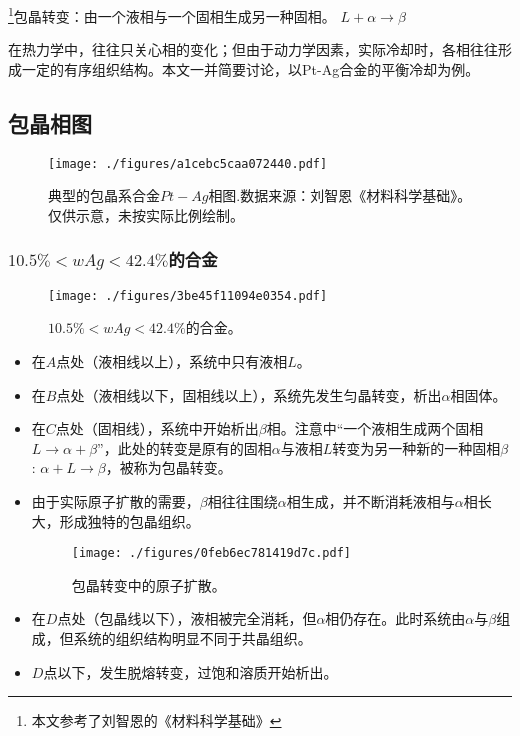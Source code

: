 

\footnote{本文参考了刘智恩的《材料科学基础》}包晶转变：由一个液相与一个固相生成另一种固相。 $L + \alpha \rightarrow \beta$

在热力学中，往往只关心相的变化；但由于动力学因素，实际冷却时，各相往往形成一定的有序组织结构。本文一并简要讨论，以Pt-Ag合金的平衡冷却为例。

\subsection{包晶相图}

\begin{figure}[ht]
\centering
\texttt{[image: ./figures/a1cebc5caa072440.pdf]}
\caption{典型的包晶系合金$Pt-Ag$相图.数据来源：刘智恩《材料科学基础》。仅供示意，未按实际比例绘制。} \label{fig_PERITC_4}
\end{figure}

\subsubsection{$10.5\%<wAg<42.4\%$的合金} 
\begin{figure}[ht]
\centering
\texttt{[image: ./figures/3be45f11094e0354.pdf]}
\caption{$10.5\%<wAg<42.4\%$的合金。} \label{fig_PERITC_2}
\end{figure}

\begin{itemize}
\item 在$A$点处（液相线以上），系统中只有液相$L$。
\item 在$B$点处（液相线以下，固相线以上），系统先发生匀晶转变，析出$\alpha$相固体。
\item 在$C$点处（固相线），系统中开始析出$\beta$相。注意中“一个液相生成两个固相$L\to\alpha+\beta$”，此处的转变是原有的固相$\alpha$与液相$L$转变为另一种新的一种固相$\beta$: $\alpha+L\to\beta$，被称为包晶转变。
\item 由于实际原子扩散的需要，$\beta$相往往围绕$\alpha$相生成，并不断消耗液相与$\alpha$相长大，形成独特的包晶组织。
\begin{figure}[ht]
\centering
\texttt{[image: ./figures/0feb6ec781419d7c.pdf]}
\caption{包晶转变中的原子扩散。} \label{fig_PERITC_6}
\end{figure}
\item 在$D$点处（包晶线以下），液相被完全消耗，但$\alpha$相仍存在。此时系统由$\alpha$与$\beta$组成，但系统的组织结构明显不同于共晶组织。
\item $D$点以下，发生脱熔转变，过饱和溶质开始析出。
\end{itemize}


